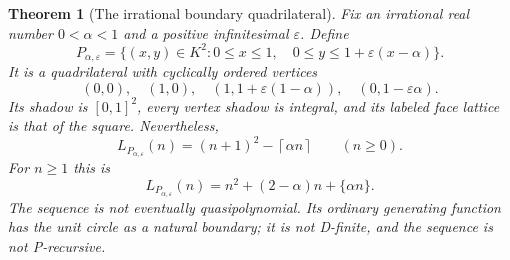 \documentclass[11pt,a4paper]{article}
\numberwithin{equation}{section}
\newtheorem{theorem}{Theorem}[section]
\theoremstyle{plain}
\newcommand{\eps}{\varepsilon}
\newcommand{\ceil}[1]{\left\lceil #1\right\rceil}
\begin{document}
\begin{theorem}[The irrational boundary quadrilateral]\label{poly:ehr:thm:quad}
Fix an irrational real number $0<\alpha<1$ and a positive infinitesimal
$\eps$. Define
\begin{equation}\label{poly:ehr:eq:quad}
 P_{\alpha,\eps}=
 \{(x,y)\in K^2:0\leq x\leq1,\quad0\leq y\leq1+\eps(x-\alpha)\}.
\end{equation}
It is a quadrilateral with cyclically ordered vertices
\begin{equation}\label{poly:ehr:eq:quad-vertices}
 (0,0),\quad (1,0),\quad
 (1,1+\eps(1-\alpha)),\quad(0,1-\eps\alpha).
\end{equation}
Its shadow is $[0,1]^2$, every vertex shadow is integral, and its labeled
face lattice is that of the square. Nevertheless,
\begin{equation}\label{poly:ehr:eq:quad-count}
 \boxed{L_{P_{\alpha,\eps}}(n)=(n+1)^2-\ceil{\alpha n}}
                         \qquad(n\geq0).
\end{equation}
For $n\geq1$ this is
\begin{equation}\label{poly:ehr:eq:fractional}
 L_{P_{\alpha,\eps}}(n)=n^2+(2-\alpha)n+\{\alpha n\}.
\end{equation}
The sequence is not eventually quasipolynomial. Its ordinary generating
function has the unit circle as a natural boundary; it is not D-finite,
and the sequence is not P-recursive.
\end{theorem}
\end{document}
